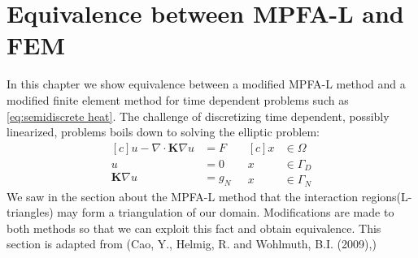 \documentclass[../Main/main.tex]{subfiles}
\begin{document}
	\chapter{Equivalence between MPFA-L and FEM}
	\graphicspath{{../Equivalence between MPFA-L and FEM/figs/}}
	In this chapter we show equivalence between a modified MPFA-L method and a modified finite element method for time dependent problems such as  \eqref{eq:semidiscrete heat}. The challenge of discretizing time dependent, possibly linearized, problems boils down to solving the elliptic problem:
	\begin{equation}\label{eq:stationary_heat}
		\begin{aligned}[c]
		u - \nabla \cdot \pmb{K} \nabla u &= F \\
			u &= 0 \\
			\pmb{K}\nabla u &= g_N
		\end{aligned}
		\ \ \
		\begin{aligned}[c]
			x &\in \Omega  \\
			x &\in  \Gamma_D \\
			x &\in \Gamma_N 
		\end{aligned}
	\end{equation}
	We saw in the section about the MPFA-L method that the interaction regions(L-triangles) may form a triangulation of our domain.
	Modifications are made to both methods so that we can exploit this fact and obtain equivalence. This section is adapted from (Cao, Y., Helmig, R. and Wohlmuth, B.I. (2009),\cite{https://doi.org/10.1002/num.20525})
\end{document}
